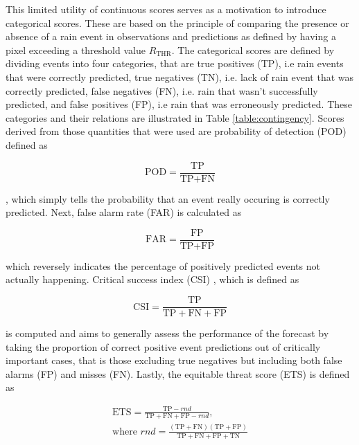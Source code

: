 This limited utility of continuous scores serves as a motivation to introduce categorical scores. These are based on the principle of comparing the presence or absence of a rain event in observations and predictions as defined by having a pixel exceeding a threshold value $R_{\text{THR}}$. The categorical scores are defined by dividing events into four categories, that are true positives (TP), i.e rain events that were correctly predicted, true negatives (TN), i.e. lack of rain event that was correctly predicted, false negatives (FN), i.e. rain that wasn't successfully predicted, and false positives (FP), i.e rain that was erroneously predicted. These categories and their relations are illustrated in Table \ref{table:contingency}. Scores derived from those quantities that were used are probability of detection (POD) \cite{schaefer_critical_1990} defined as

\begin{equation}
	\text{POD} = \frac{\text{TP}}{\text{TP}+\text{FN}}
\end{equation} 

, which simply tells the probability that an event really occuring is correctly predicted. Next, false alarm rate (FAR) \cite{schaefer_critical_1990} is calculated as 

\begin{equation}
	\text{FAR} = \frac{\text{FP}}{\text{TP}+\text{FP}}
\end{equation}

which reversely indicates the percentage of positively predicted events not actually happening. Critical success index (CSI) \cite{schaefer_critical_1990}, which is defined as 

\begin{equation}
	\text{CSI} = \frac{\text{TP}}{\text{TP}+\text{FN}+\text{FP}}
\end{equation}

is computed and aims to generally assess the performance of the forecast by taking the proportion of correct positive event predictions out of critically important cases, that is those excluding true negatives but including both false alarms (FP) and misses (FN). Lastly, the equitable threat score (ETS) \cite{hogan_equitability_2010} is defined as  

\begin{equation}
\begin{split}
\text{ETS} = \frac{\text{TP} - rnd}{\text{TP}+\text{FN}+\text{FP}- rnd}, \\
\text{where } rnd = \frac{(\text{TP}+\text{FN})(\text{TP}+\text{FP})}{\text{TP}+\text{FN}+\text{FP}+\text{TN}}
\end{split}
\end{equation}

